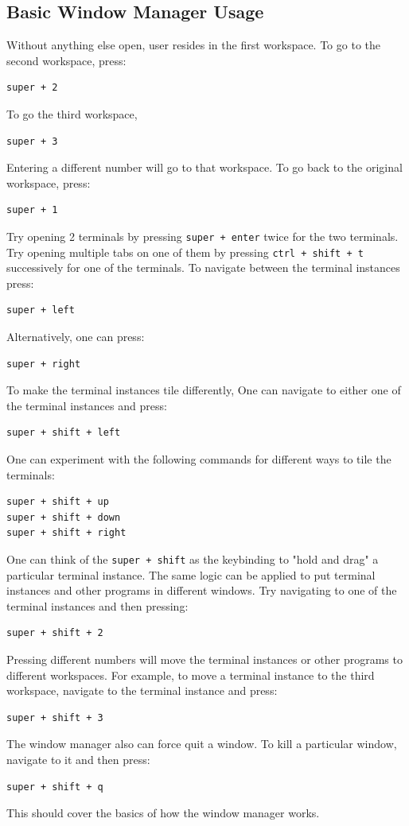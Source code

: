 \documentclass[a4paper, 12pt]{report}
\begin{document}
\begin{center}
\subsection{Basic Window Manager Usage}

Without anything else open, user resides in the first workspace. To go to the second workspace, press:
\begin{lstlisting}
super + 2
\end{lstlisting}
To go the third workspace,
\begin{lstlisting}
super + 3
\end{lstlisting}
Entering a different number will go to that workspace.  To go back to the original workspace, press:
\begin{lstlisting}
super + 1
\end{lstlisting}
Try opening 2 terminals by pressing \texttt{super + enter} twice for the two terminals. Try opening multiple tabs on one of them by pressing \texttt{ctrl + shift + t} successively for one of the terminals. To navigate between the terminal instances press:
\begin{lstlisting}
super + left
\end{lstlisting}
Alternatively, one can press:
\begin{lstlisting}
super + right
\end{lstlisting}
To make the terminal instances tile differently, One can navigate to either one of the terminal instances and press:
\begin{lstlisting}
super + shift + left
\end{lstlisting}
One can experiment with the following commands for different ways to tile the terminals:
\begin{lstlisting}
super + shift + up
super + shift + down
super + shift + right
\end{lstlisting}
One can think of the \texttt{super + shift} as the keybinding to "hold and drag" a particular terminal instance. The same logic can be applied to put terminal instances and other programs in different windows. Try navigating to one of the terminal instances and then pressing:
\begin{lstlisting}
super + shift + 2
\end{lstlisting}
Pressing different numbers will move the terminal instances or other programs to different workspaces. For example, to move a terminal instance to the third workspace, navigate to the terminal instance and press:
\begin{lstlisting}
super + shift + 3
\end{lstlisting}
The window manager also can force quit a window. To kill a particular window, navigate to it and then press:
\begin{lstlisting}
super + shift + q
\end{lstlisting}
This should cover the basics of how the window manager works.


\end{center}
\end{document}
